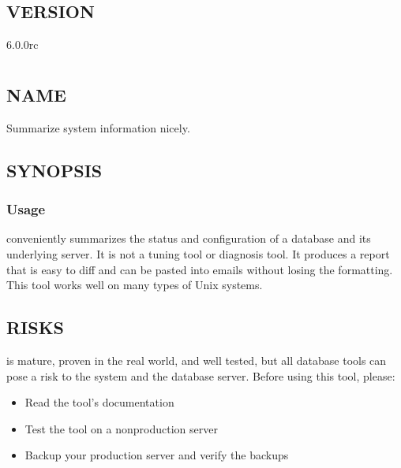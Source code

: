 \documentclass[letterpaper,10pt,english]{sphinxmanual}
\begin{document}
\section{VERSION}
\label{\detokenize{mariadb-status-diff:version}}
 6.0.0rc


\chapter{}
\label{\detokenize{mariadb-summary:mariadb-summary}}\label{\detokenize{mariadb-summary::doc}}

\section{NAME}
\label{\detokenize{mariadb-summary:name}}
 \sphinxhyphen{} Summarize system information nicely.


\section{SYNOPSIS}
\label{\detokenize{mariadb-summary:synopsis}}

\subsection{Usage}
\label{\detokenize{mariadb-summary:usage}}
\begin{sphinxVerbatim}[commandchars=\\\{\}]
\end{sphinxVerbatim}

 conveniently summarizes the status and configuration of
a database and its underlying server. It is not a tuning tool or diagnosis tool.
It produces a report that is easy to diff and can be pasted into emails without
losing the formatting. This tool works well on many types of Unix systems.


\section{RISKS}
\label{\detokenize{mariadb-summary:risks}}
 is mature, proven in the real world, and well tested,
but all database tools can pose a risk to the system and the database
server.  Before using this tool, please:
\begin{itemize}
\item {} 
Read the tool’s documentation

\item {} 
Test the tool on a non\sphinxhyphen{}production server

\item {} 
Backup your production server and verify the backups

\end{itemize}
\end{document}
